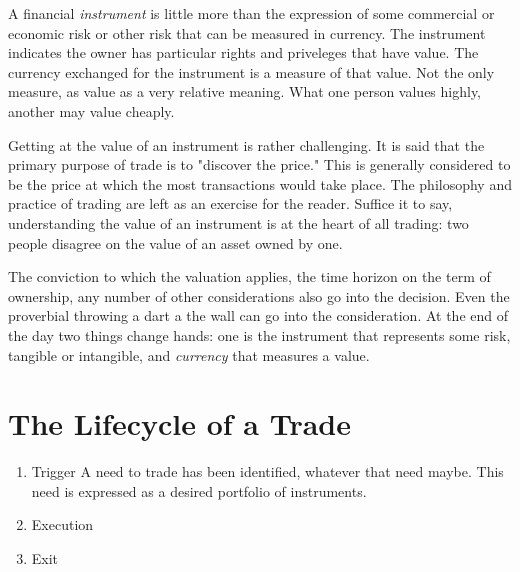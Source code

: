 A financial \emph{instrument} is little more than the expression of some commercial or 
economic risk or other risk that can be measured in currency. The instrument indicates the
owner has particular rights and priveleges that have value.  The currency exchanged for the
instrument is a measure of that value.  Not the only measure, as value as a very relative
meaning.  What one person values highly, another may value cheaply.

Getting at the value of an instrument is rather challenging.  It is said that the primary
purpose of trade is to "discover the price."  This is generally considered to be the price
at which the most transactions would take place.  The philosophy and practice of trading
are left as an exercise for the reader.  Suffice it to say, understanding the value of
an instrument is at the heart of all trading: two people disagree on the value of an asset
owned by one.

The conviction to which the valuation applies, the time horizon on the term of ownership,
any number of other considerations also go into the decision.  Even the proverbial throwing
a dart a the wall can go into the consideration.  At the end of the day two things change
hands: one is the instrument that represents some risk, tangible or intangible, and 
\emph{currency} that measures a value.



\section{The Lifecycle of a Trade}

\begin{enumerate}
\item{Trigger} A need to trade has been identified, whatever that need maybe.  This need
is expressed as a desired portfolio of instruments.
\item{Execution}
\item{Exit}
\end{enumerate}
